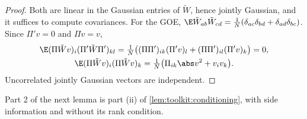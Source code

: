 \begin{refsection}
\begin{proof}
Both are linear in the Gaussian entries of $\tilde W$, hence jointly Gaussian, and it suffices to compute covariances. For the GOE, $\E\tilde W_{ab}\tilde W_{cd}=\frac1N(\delta_{ac}\delta_{bd}+\delta_{ad}\delta_{bc})$. Since $\Pi'v=0$ and $\Pi v=v$,
\begin{gather*}
\E(\Pi\tilde Wv)_i(\Pi'\tilde W\Pi')_{kl}=\tfrac1N\bigl((\Pi\Pi')_{ik}(\Pi'v)_l+(\Pi\Pi')_{il}(\Pi'v)_k\bigr)=0,\\
\E(\Pi\tilde Wv)_i(\Pi\tilde Wv)_k=\tfrac1N\bigl(\Pi_{ik}\abs v^2+v_iv_k\bigr).
\end{gather*}
Uncorrelated jointly Gaussian vectors are independent.
\end{proof}

Part 2 of the next lemma is part (ii) of \cref{lem:toolkit:conditioning}, with side information and without its rank condition.



\end{refsection}
